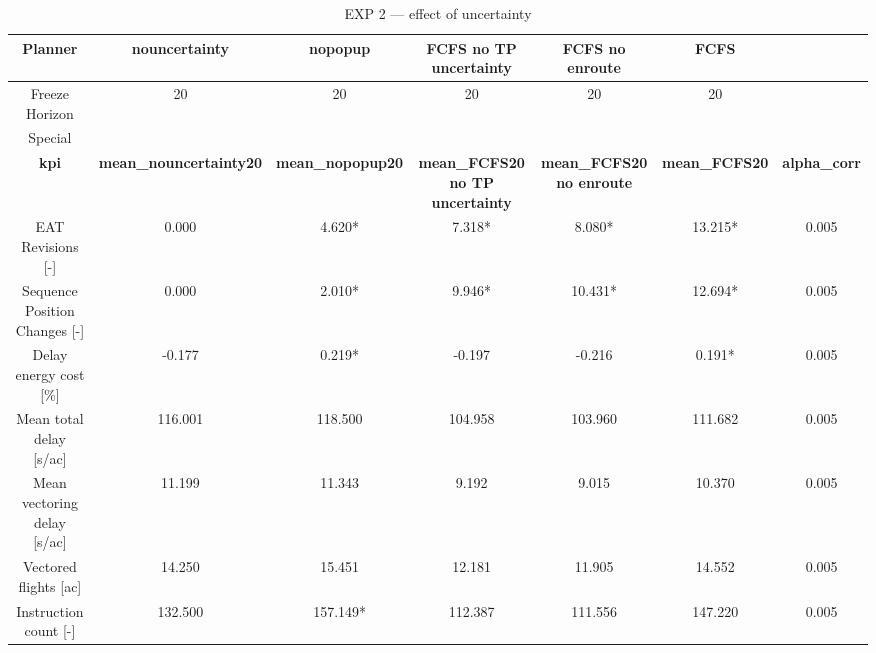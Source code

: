 \begin{table}[htbp]
\caption{EXP 2 — effect of uncertainty}
\begin{center}
\footnotesize
\setlength{\tabcolsep}{3pt}
\renewcommand{\arraystretch}{1.000}
\begin{tabular}{|c|c|c|c|c|c|c|}
\hline
Planner & nouncertainty & nopopup & FCFS no TP uncertainty & FCFS no enroute & FCFS &  \\
\hline
Freeze Horizon & 20 & 20 & 20 & 20 & 20 &  \\
\hline
Special &  &  &  &  &  &  \\
\hline
\textbf{kpi} & \textbf{mean\_nouncertainty20} & \textbf{mean\_nopopup20} & \textbf{mean\_FCFS20 no TP uncertainty} & \textbf{mean\_FCFS20 no enroute} & \textbf{mean\_FCFS20} & \textbf{alpha\_corr} \\
\hline
EAT Revisions [-] & 0.000 & 4.620* & 7.318* & 8.080* & 13.215* & 0.005 \\
\hline
Sequence Position Changes [-] & 0.000 & 2.010* & 9.946* & 10.431* & 12.694* & 0.005 \\
\hline
Delay energy cost [\%] & -0.177 & 0.219* & -0.197 & -0.216 & 0.191* & 0.005 \\
\hline
Mean total delay [s/ac] & 116.001 & 118.500 & 104.958 & 103.960 & 111.682 & 0.005 \\
\hline
Mean vectoring delay [s/ac] & 11.199 & 11.343 & 9.192 & 9.015 & 10.370 & 0.005 \\
\hline
Vectored flights [ac] & 14.250 & 15.451 & 12.181 & 11.905 & 14.552 & 0.005 \\
\hline
Instruction count [-] & 132.500 & 157.149* & 112.387 & 111.556 & 147.220 & 0.005 \\
\hline
\end{tabular}
\label{tab:exp\_2\_effect\_of\_uncertainty}
\end{center}
\end{table}